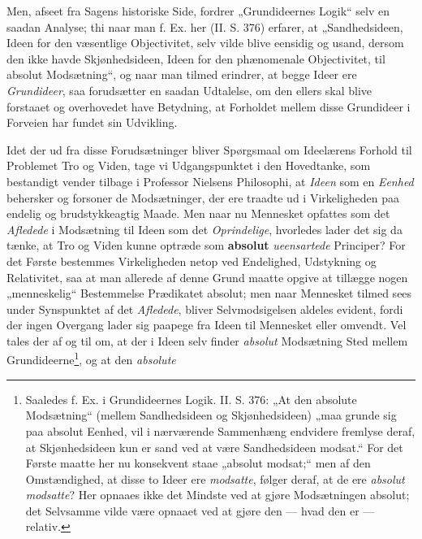 \documentclass[12pt,a4paper]{book}
\newcommand{\opage}[1]{\marginnote{\footnotesize\textit{[#1]}}}
\begin{document}
Men, afseet fra Sagens historiske Side, fordrer
„Grundideernes Logik“ selv en saadan Analyse; thi naar
man f. Ex. her (II. S. 376) erfarer, at „Sandhedsideen,
Ideen for den væsentlige Objectivitet, selv vilde
blive eensidig og usand, dersom den ikke havde Skjønhedsideen,
Ideen for den phænomenale Objectivitet, til
absolut Modsætning“, og naar man tilmed erindrer, at
begge Ideer ere \emph{Grundideer}, saa forudsætter en saadan
Udtalelse, om den ellers skal blive forstaaet og over\opage{44}\setcounter{footnote}{0}hovedet
have Betydning, at Forholdet mellem disse
Grundideer i Forveien har fundet sin Udvikling.

Idet der ud fra disse Forudsætninger bliver Spørgsmaal
om Ideelærens Forhold til Problemet Tro og
Viden, tage vi Udgangspunktet i den Hovedtanke, som
bestandigt vender tilbage i Professor Nielsens Philosophi,
at \emph{Ideen} som en \emph{Eenhed} behersker og forsoner de
Modsætninger, der ere traadte ud i Virkeligheden paa endelig
og brudstykkeagtig Maade. Men naar nu Mennesket
opfattes som det \emph{Afledede} i Modsætning til Ideen som
det \emph{Oprindelige}, hvorledes lader det sig da tænke,
at Tro og Viden kunne optræde som \textbf{absolut} \emph{ueensartede}
Principer? For det Første bestemmes Virkeligheden
netop ved Endelighed, Udstykning og Relativitet,
saa at man allerede af denne Grund maatte opgive at
tillægge nogen „menneskelig“ Bestemmelse Prædikatet absolut;
men naar Mennesket tilmed sees under Synspunktet
af det \emph{Afledede}, bliver Selvmodsigelsen aldeles
evident, fordi der ingen Overgang lader sig paapege fra
Ideen til Mennesket eller omvendt. Vel tales der af og
til om, at der i Ideen selv finder \emph{absolut} Modsætning
Sted mellem Grundideerne\footnote{Saaledes f. Ex. i Grundideernes Logik. II. S. 376: „At
den absolute Modsætning“ (mellem Sandhedsideen og Skjønhedsideen)
„maa grunde sig paa absolut Eenhed, vil i nærværende
Sammenhæng endvidere fremlyse deraf, at Skjønhedsideen
kun er sand ved at være Sandhedsideen modsat.“
For det Første maatte her nu konsekvent staae „absolut modsat;“
men af den Omstændighed, at disse to Ideer ere \emph{modsatte},
følger deraf, at de ere \emph{absolut modsatte}? Her
opnaaes ikke det Mindste ved at gjøre Modsætningen absolut;
det Selvsamme vilde være opnaaet ved at gjøre den
--- hvad den er --- relativ.}, og at den \emph{absolute}
\end{document}
